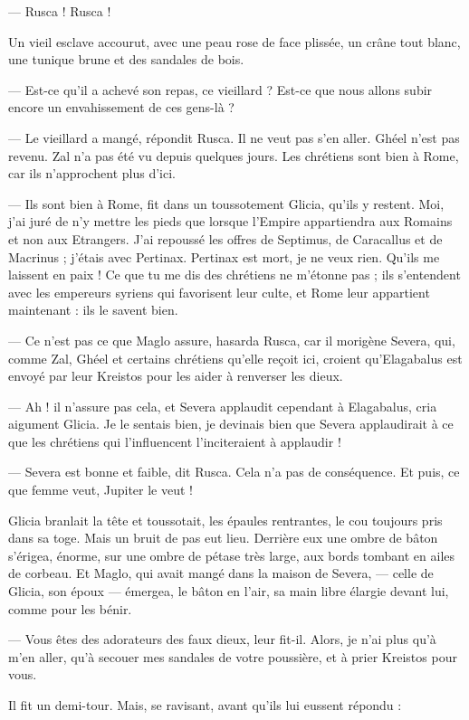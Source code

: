 \documentclass[a4paper, 11pt, oneside, polutonikogreek, french]{article}
\begin{document}
--- Rusca ! Rusca !

Un vieil esclave accourut, avec une peau rose de face plissée, un crâne tout blanc, une tunique brune et des sandales de bois.

--- Est-ce qu'il a achevé son repas, ce vieillard ? Est-ce que nous allons subir encore un envahissement de ces gens-là ?

--- Le vieillard a mangé, répondit Rusca. Il ne veut pas s'en aller. Ghéel n'est pas revenu. Zal n'a pas été vu depuis quelques jours. Les chrétiens sont bien à Rome, car ils n'approchent plus d'ici.

--- Ils sont bien à Rome, fit dans un toussotement Glicia, qu'ils y restent. Moi, j'ai juré de n'y mettre les pieds que lorsque l'Empire appartiendra aux Romains et non aux Etrangers. J'ai repoussé les offres de Septimus, de Caracallus et de Macrinus ; j'étais avec Pertinax. Pertinax est mort, je ne veux rien. Qu'ils me laissent en paix ! Ce que tu me dis des chrétiens ne m'étonne pas ; ils s'entendent avec les empereurs syriens qui favorisent leur culte, et Rome leur appartient maintenant : ils le savent bien.

--- Ce n'est pas ce que Maglo assure, hasarda Rusca, car il morigène Severa, qui, comme Zal, Ghéel et certains chrétiens qu'elle reçoit ici, croient qu'Elagabalus est envoyé par leur Kreistos pour les aider à renverser les dieux.

--- Ah ! il n'assure pas cela, et Severa applaudit cependant à Elagabalus, cria aigument Glicia. Je le sentais bien, je devinais bien que Severa applaudirait à ce que les chrétiens qui l'influencent l'inciteraient à applaudir !

--- Severa est bonne et faible, dit Rusca. Cela n'a pas de conséquence. Et puis, ce que femme veut, Jupiter le veut !

Glicia branlait la tête et toussotait, les épaules rentrantes, le cou toujours pris dans sa toge. Mais un bruit de pas eut lieu. Derrière eux une ombre de bâton s'érigea, énorme, sur une ombre de pétase très large, aux bords tombant en ailes de corbeau. Et Maglo, qui avait mangé dans la maison de Severa, --- celle de Glicia, son époux --- émergea, le bâton en l'air, sa main libre élargie devant lui, comme pour les bénir.

--- Vous êtes des adorateurs des faux dieux, leur fit-il. Alors, je n'ai plus qu'à m'en aller, qu'à secouer mes sandales de votre poussière, et à prier Kreistos pour vous.

Il fit un demi-tour. Mais, se ravisant, avant qu'ils lui eussent répondu :
\end{document}
